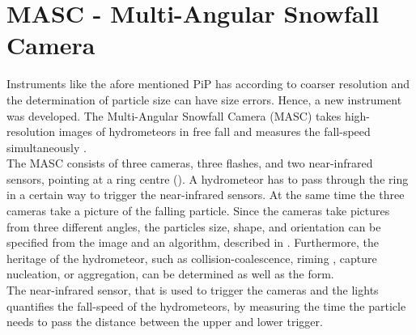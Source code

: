 \section{MASC - Multi-Angular Snowfall Camera}

Instruments like the afore mentioned PiP has according to \cite{garrett_fall_2012} coarser resolution and the determination of particle size can have size errors. Hence, a new instrument was developed. The Multi-Angular Snowfall Camera (MASC) takes high-resolution images of hydrometeors in free fall and measures the fall-speed simultaneously . \\
The MASC consists of three cameras, three flashes, and two near-infrared sensors, pointing at a ring centre (). A hydrometeor has to pass through the ring in a certain way to trigger the near-infrared sensors. At the same time the three cameras take a picture of the falling particle. Since the cameras take pictures from three different angles, the particles size, shape, and orientation can be specified from the image and an algorithm, described in \cite{garrett_fall_2012}. Furthermore, the heritage of the hydrometeor, such as collision-coalescence, riming , capture nucleation, or aggregation, can be determined as well as the form. \\
The near-infrared sensor, that is used to trigger the cameras and the lights quantifies the fall-speed of the hydrometeors, by measuring the time the particle needs to pass the distance between the upper and lower trigger.    
